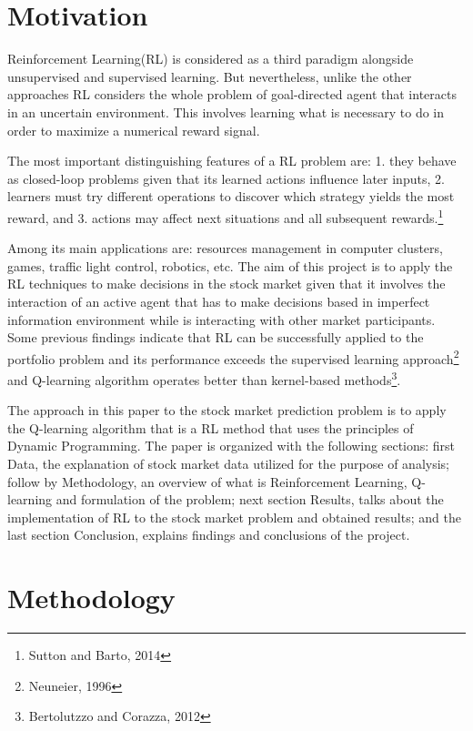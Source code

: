 \documentclass[12pt]{article}
\title{}
\author{}
\begin{document}
\maketitle


\section{Motivation}
Reinforcement Learning(RL) is considered as a third paradigm alongside unsupervised and supervised learning. But nevertheless, unlike the other approaches RL considers the whole problem of goal-directed agent that interacts in an uncertain environment. This involves learning what is necessary to do in order to maximize a numerical reward signal. 

The most important distinguishing features of a RL problem are: 1. they behave as closed-loop problems given that its learned actions influence later inputs, 2. learners must try different operations to discover which strategy yields the most reward, and 3. actions may affect next situations and all subsequent rewards.\footnote{Sutton and Barto, 2014}

Among its main applications are: resources management in computer clusters, games, traffic light control, robotics, etc. The aim of this project is to apply the RL techniques to make decisions in the stock market given that it involves the interaction of an active agent that has to make decisions based in imperfect information environment while is interacting with other market participants. Some previous findings indicate that RL can be successfully applied to the portfolio problem and its performance exceeds the supervised learning approach\footnote{Neuneier, 1996} and Q-learning algorithm operates better than kernel-based methods\footnote{Bertolutzzo and Corazza, 2012}.

The approach in this paper to the stock market prediction problem is to apply the Q-learning algorithm that is a RL method that uses the principles of Dynamic Programming. The paper is organized with the following sections: first Data, the explanation of stock market data utilized for the purpose of analysis; follow by Methodology, an overview of what is Reinforcement Learning, Q-learning and formulation of the problem; next section Results, talks about the implementation of RL to the stock market problem and obtained results; and the last section Conclusion, explains findings and conclusions of the project.             


\section{Methodology}
\end{document}
